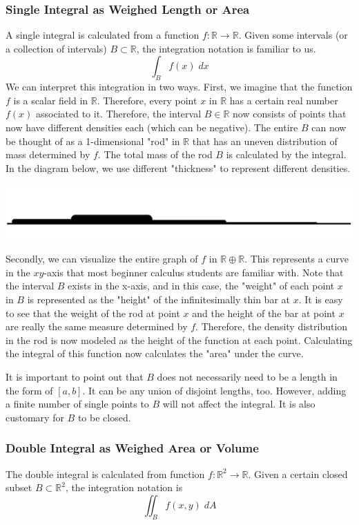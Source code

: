 \documentclass{article}
\theoremstyle{remark}
\theoremstyle{definition}
\begin{document}
\subsubsection{Single Integral as Weighed Length or Area}
A single integral is calculated from a function $f: \mathbb{R} \longrightarrow \mathbb{R}$. Given some intervals (or a collection of intervals) $B \subset \mathbb{R}$, the integration notation is familiar to us. 
\[\int_B f(x) \; d x\]
We can interpret this integration in two ways. First, we imagine that the function $f$ is a scalar field in $\mathbb{R}$. Therefore, every point $x$ in $\mathbb{R}$ has a certain real number $f(x)$ associated to it. Therefore, the interval $B \in \mathbb{R}$ now consists of points that now have different densities each (which can be negative). The entire $B$ can now be thought of as a 1-dimensional "rod" in $\mathbb{R}$ that has an uneven distribution of mass determined by $f$. The total mass of the rod $B$ is calculated by the integral. In the diagram below, we use different "thickness" to represent different densities. 
\begin{center}
    \includegraphics[scale=0.3]{img/Integral_As_Stick_with_Density.PNG}
\end{center}
Secondly, we can visualize the entire graph of $f$ in $\mathbb{R} \oplus \mathbb{R}$. This represents a curve in the $x y$-axis that most beginner calculus students are familiar with. Note that the interval $B$ exists in the x-axis, and in this case, the "weight" of each point $x$ in $B$ is represented as the "height" of the infinitesimally thin bar at $x$. It is easy to see that the weight of the rod at point $x$ and the height of the bar at point $x$ are really the same measure determined by $f$. Therefore, the density distribution in the rod is now modeled as the height of the function at each point. Calculating the integral of this function now calculates the "area" under the curve.

It is important to point out that $B$ does not necessarily need to be a length in the form of $[a,b]$. It can be any union of disjoint lengths, too. However, adding a finite number of single points to $B$ will not affect the integral. It is also customary for $B$ to be closed. 

\subsubsection{Double Integral as Weighed Area or Volume}
The double integral is calculated from function $f: \mathbb{R}^2 \longrightarrow \mathbb{R}$. Given a certain closed subset $B \subset \mathbb{R}^2$, the integration notation is
\[\iint_B f(x, y) \; d A\]
\end{document}
